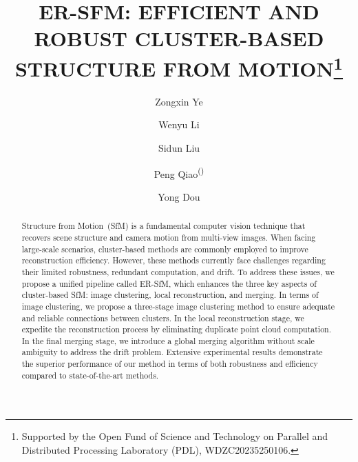 \documentclass[runningheads]{llncs}
\begin{document}
%
\title{ER-SFM: EFFICIENT AND ROBUST CLUSTER-BASED STRUCTURE FROM MOTION\thanks{Supported by the Open Fund of Science and Technology on Parallel and Distributed Processing Laboratory (PDL), WDZC20235250106.}}

%

\author{Zongxin Ye \and
Wenyu Li \and
Sidun Liu \and
Peng Qiao\textsuperscript{(\Letter)} \and
Yong Dou
} 

%
%


\maketitle              %

\begin{abstract}
Structure from Motion~(SfM) is a fundamental computer vision technique that recovers scene structure and camera motion from multi-view images. When facing large-scale scenarios, cluster-based methods are commonly employed to improve reconstruction efficiency. However, these methods currently face challenges regarding their limited robustness, redundant computation, and drift. To address these issues, we propose a unified pipeline called ER-SfM, which enhances the three key aspects of cluster-based SfM: image clustering, local reconstruction, and merging. In terms of image clustering, we propose a three-stage image clustering method to ensure adequate and reliable connections between clusters. In the local reconstruction stage, we expedite the reconstruction process by eliminating duplicate point cloud computation. In the final merging stage, we introduce a global merging algorithm without scale ambiguity to address the drift problem. Extensive experimental results demonstrate the superior performance of our method in terms of both robustness and efficiency compared to state-of-the-art methods.

\end{abstract}
\end{document}
